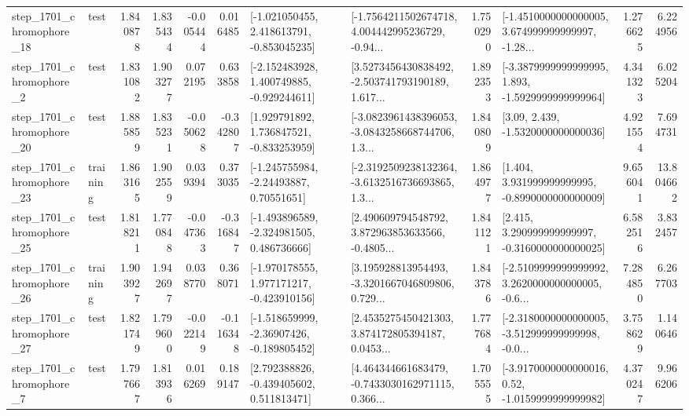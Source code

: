 \begin{tabular}{llrrrrllrlrr}
 step\_1701\_chromophore\_18 &      test &      1.840878 &    1.835434 &     -0.005444 &  0.016485 &   [-1.021050455, 2.418613791, -0.853045235] &  [-1.7564211502674718, 4.004442995236729, -0.94... &       1.750290 &  [-1.4510000000000005, 3.674999999999997, -1.28... &            1.276625 &          6.224956 \\
  step\_1701\_chromophore\_2 &      test &      1.831082 &    1.903277 &      0.072195 &  0.633858 &   [-2.152483928, 1.400749885, -0.929244611] &  [3.5273456430838492, -2.503741793190189, 1.617... &       1.892353 &  [-3.3879999999999995, 1.893, -1.5929999999999964] &            4.341323 &          6.025204 \\
 step\_1701\_chromophore\_20 &      test &      1.885859 &    1.835231 &     -0.050628 & -0.342807 &    [1.929791892, 1.736847521, -0.833253959] &  [-3.0823961438396053, -3.0843258668744706, 1.3... &       1.840809 &                 [3.09, 2.439, -1.5320000000000036] &            4.921554 &          7.694731 \\
 step\_1701\_chromophore\_23 &  training &      1.863165 &    1.902559 &      0.039394 &  0.373035 &     [-1.245755984, -2.24493887, 0.70551651] &  [-2.3192509238132364, -3.6132516736693865, 1.3... &       1.864977 &    [1.404, 3.931999999999995, -0.8990000000000009] &            9.656041 &         13.804662 \\
 step\_1701\_chromophore\_25 &      test &      1.818211 &    1.770848 &     -0.047363 & -0.316847 &   [-1.493896589, -2.324981505, 0.486736666] &  [2.490609794548792, 3.872963853633566, -0.4805... &       1.841121 &    [2.415, 3.290999999999997, -0.3160000000000025] &            6.582516 &          3.832457 \\
 step\_1701\_chromophore\_26 &  training &      1.903927 &    1.942697 &      0.038770 &  0.368071 &   [-1.970178555, 1.977171217, -0.423910156] &  [3.195928813954493, -3.3201667046809806, 0.729... &       1.843786 &  [-2.5109999999999992, 3.2620000000000005, -0.6... &            7.284850 &          6.267703 \\
 step\_1701\_chromophore\_27 &      test &      1.821749 &    1.799600 &     -0.022149 & -0.116348 &   [-1.518659999, -2.36907426, -0.189805452] &  [2.4535275450421303, 3.874172805394187, 0.0453... &       1.777684 &  [-2.3180000000000005, -3.512999999999998, -0.0... &            3.758629 &          1.140646 \\
  step\_1701\_chromophore\_7 &      test &      1.797667 &    1.813936 &      0.016269 &  0.189147 &    [2.792388826, -0.439405602, 0.511813471] &  [4.464344661683479, -0.7433030162971115, 0.366... &       1.705555 &   [-3.9170000000000016, 0.52, -1.0159999999999982] &            4.370247 &          9.966206 \\

\end{tabular}
